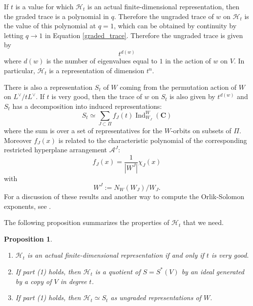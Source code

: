 \documentclass[10pt]{amsart}
\newcommand{\complex}{\mathbf C}
\renewcommand{\H}{{\mathcal{H}_t}}
\DeclareMathOperator{\Ind}{Ind}
\theoremstyle{plain}
\newtheorem{proposition}[theorem]{Proposition}
\theoremstyle{definition}
\theoremstyle{remark}
\begin{document}
If $t$ is a value for which $\H$ is an actual finite-dimensional representation,
then the graded trace is a polynomial in $q$.  Therefore the ungraded trace of 
$w$ on $\H$ is the value of this polynomial at $q=1$, which can
be obtained by continuity by
letting $q \to 1$ in Equation \ref{graded_trace}.
Therefore the ungraded trace is given by $$t^{d(w)}$$
where $d(w)$ is the number of eigenvalues equal to $1$ in the action of $w$ on $V$.  
In particular, $\H$ is a representation of dimension $t^n$. %

There is also a representation $S_t$ of $W$ coming from the permutation action of $W$ on $L^{\vee}/t L^{\vee}$. 
If $t$ is very good, then the trace of $w$ on $S_t$ is also given
by $t^{d(w)}$ and 
$S_t$ has a decomposition into induced representations:
\begin{equation} \label{decomp}
S_t \simeq \sum_{J \subset \Pi} f_J(t) \Ind_{W_J}^W (\complex)
\end{equation}
where the sum is over a set of representatives for the $W$-orbits on subsets of $\Pi$.
Moreover $f_J(x)$ is related to the characteristic polynomial of the corresponding restricted hyperplane arrangement $\mathcal{A}^J$:
$$f_J(x) = \frac{1}{|W^J|} \chi_J(x)$$ with
$$W^J := N_W(W_J)/W_J.$$  
For a discussion of these results and another way to compute the Orlik-Solomon exponents, see  \cite{sommers:affineweylgp}.


The following proposition summarizes the properties of $\H$ that we need.
\begin{proposition} \label{properties}
\begin{enumerate}
\item $\H$ is an actual finite-dimensional representation if and only if $t$ is very good.  
\item If part (1) holds, then $\H$ is a quotient of $S=S^*(V)$ by an ideal generated by a copy of $V$ in degree $t$.
\item If part (1) holds, then $\H \simeq S_t$ as ungraded representations of $W$.
\end{enumerate}
\end{proposition}
\end{document}
